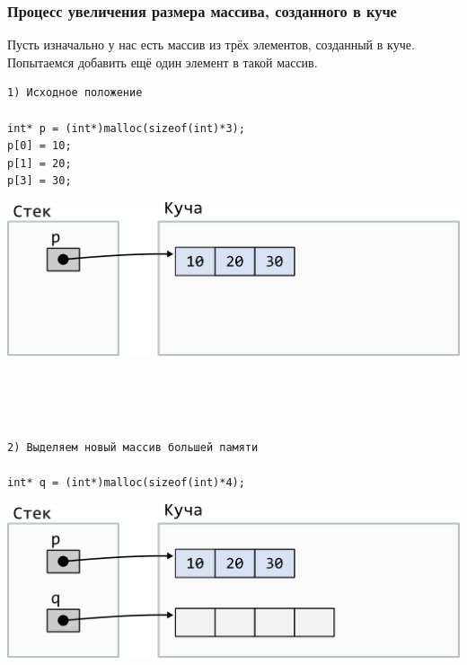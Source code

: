 \documentclass{article}
\begin{document}
\subsubsection*{Процесс увеличения размера массива, созданного в куче}
Пусть изначально у нас есть массив из трёх элементов, созданный в куче.
Попытаемся добавить ещё один элемент в такой массив.


\noindent\begin{minipage}{.45\textwidth}
\begin{lstlisting}
1) Исходное положение

int* p = (int*)malloc(sizeof(int)*3);
p[0] = 10;
p[1] = 20;
p[3] = 30;
\end{lstlisting}
\end{minipage}
\begin{minipage}{.45\textwidth}
\includegraphics[scale=0.75]{../images/malloc_realocation1.png}
\end{minipage}
\quad\\
\quad\\
\quad\\


\noindent\begin{minipage}{.45\textwidth}
\begin{lstlisting}
2) Выделяем новый массив большей памяти

int* q = (int*)malloc(sizeof(int)*4);
\end{lstlisting}
\end{minipage}
\begin{minipage}{.45\textwidth}
\includegraphics[scale=0.75]{../images/malloc_realocation2.png}
\end{minipage}
\quad\\
\quad\\
\quad\\
\end{document}
